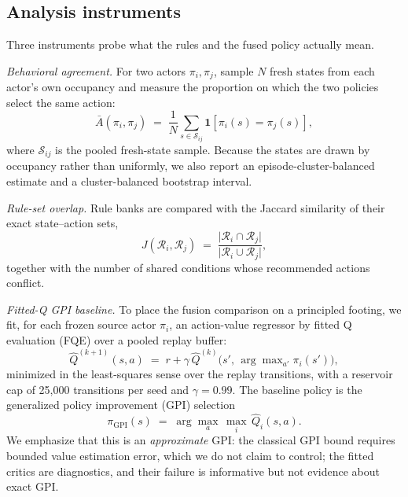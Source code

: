 \documentclass[11pt]{article}
\begin{document}
\subsection{Analysis instruments}
\label{sec:method:instruments}

Three instruments probe what the rules and the fused policy actually mean.

\emph{Behavioral agreement.} For two actors $\pi_i,\pi_j$, sample $N$ fresh states from each
actor's own occupancy and measure the proportion on which the two policies select the same action:
\begin{equation}
\bar{A}(\pi_i,\pi_j) \;=\; \frac{1}{N}\sum_{s\in\mathcal{S}_{ij}} \mathbf{1}[\pi_i(s)=\pi_j(s)],
\label{eq:agreement}
\end{equation}
where $\mathcal{S}_{ij}$ is the pooled fresh-state sample. Because the states are drawn by
occupancy rather than uniformly, we also report an episode-cluster-balanced estimate and a
cluster-balanced bootstrap interval.

\emph{Rule-set overlap.} Rule banks are compared with the Jaccard similarity of their exact
state--action sets,
\begin{equation}
J(\mathcal{R}_i,\mathcal{R}_j) \;=\; \frac{\lvert \mathcal{R}_i \cap \mathcal{R}_j \rvert}{\lvert \mathcal{R}_i \cup \mathcal{R}_j \rvert},
\label{eq:jaccard}
\end{equation}
together with the number of shared conditions whose recommended actions conflict.

\emph{Fitted-Q GPI baseline.} To place the fusion comparison on a principled footing, we fit, for
each frozen source actor $\pi_i$, an action-value regressor by fitted Q evaluation (FQE)
\cite{le2019batch,voloshin2021empirical} over a pooled replay buffer:
\begin{equation}
\hat{Q}^{(k+1)}(s,a) \;=\; r + \gamma\,\hat{Q}^{(k)}\big(s',\,\arg\max\nolimits_{a'}\pi_i(s')\big),
\label{eq:fqe}
\end{equation}
minimized in the least-squares sense over the replay transitions, with a reservoir cap of 25,000
transitions per seed and $\gamma=0.99$. The baseline policy is the generalized policy improvement
(GPI) selection \cite{sutton2018reinforcement}
\begin{equation}
\pi_{\mathrm{GPI}}(s) \;=\; \arg\max_{a}\,\max_{i}\,\hat{Q}_i(s,a).
\label{eq:gpi}
\end{equation}
We emphasize that this is an \emph{approximate} GPI: the classical GPI bound requires bounded value
estimation error, which we do not claim to control; the fitted critics are diagnostics, and their
failure is informative but not evidence about exact GPI.
\end{document}
